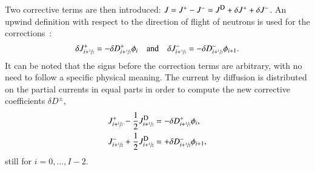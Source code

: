 Two corrective terms are then introduced: $J = \jp - \jm = \jD + \delta J^+ + \delta J^-$. An upwind definition with respect to the direction of flight of neutrons is used for the corrections~\cite{Jarrett-2016,Zhu-2016}:
\begin{equation}
  \label{eq:CCF-sub}
  \delta J^+ _{i+\sfrac{1}{2}} = -\delta D^+ _{i+\sfrac{1}{2}} \phi_i
  \quad \text{and} \quad
  \delta J^- _{i+\sfrac{1}{2}} = -\delta D^- _{i+\sfrac{1}{2}} \phi_{i+1}.
\end{equation}
It can be noted that the signs before the correction terms are arbitrary, with no need to follow a specific physical meaning. 
%
%
The current by diffusion is distributed on the partial currents in equal parts in order to compute the new corrective coefficients $\delta D^{\pm}$,
\begin{subequations}
  \label{eq:delta-D-pCMFD}
  \begin{align}
    J^+_{i+\hzi} - \frac{1}{2}\jD_{i+\hzi} &= -\delta D^+_{i+\hzi} \phi_i, \label{eq:delta-D-pCMFDp}\\
    J^-_{i+\hzi} + \frac{1}{2}\jD_{i+\hzi} &= +\delta D^-_{i+\hzi} \phi_{i+1}, \label{eq:delta-D-pCMFDm}
  \end{align}
\end{subequations}
still for $i=0, \ldots, I-2$.
%
%
